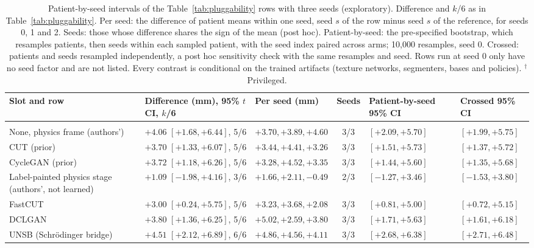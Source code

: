 
\begin{table}[tp]
\renewcommand{\baselinestretch}{1}\scriptsize\setlength{\fboxsep}{0.6pt}
\caption{Patient-by-seed intervals of the Table~\ref{tab:pluggability} rows with three seeds (exploratory). Difference and $k$/6 as in Table~\ref{tab:pluggability}. Per seed: the difference of patient means within one seed, seed $s$ of the row minus seed $s$ of the reference, for seeds 0, 1 and 2. Seeds: those whose difference shares the sign of the mean (post hoc). Patient-by-seed: the pre-specified bootstrap, which resamples patients, then seeds within each sampled patient, with the seed index paired across arms; 10,000 resamples, seed 0. Crossed: patients and seeds resampled independently, a post hoc sensitivity check with the same resamples and seed. Rows run at seed 0 only have no seed factor and are not listed. Every contrast is conditional on the trained artifacts (texture networks, segmenters, bases and policies). $^{\dagger}$Privileged.}
\label{tab:patient-seed}
\centering
\setlength{\tabcolsep}{3pt}
\begin{tabularx}{\textwidth}{@{}>{\raggedright\arraybackslash}X l l c l l@{}}
\toprule
Slot and row & Difference (mm), 95\% $t$ CI, $k$/6 & Per seed (mm) & Seeds & Patient-by-seed 95\% CI & Crossed 95\% CI \\
\midrule
\multicolumn{6}{@{}l}{\textit{Texture stage}, minus SonoSPADE} \\
\quad None, physics frame (authors') & $+4.06$ $[+1.68, +6.44]$, 5/6 & $+3.70, +3.89, +4.60$ & 3/3 & $[+2.09, +5.70]$ & $[+1.99, +5.75]$ \\
\quad CUT (prior)~\cite{cut} & $+3.70$ $[+1.33, +6.07]$, 5/6 & $+3.44, +4.41, +3.26$ & 3/3 & $[+1.51, +5.73]$ & $[+1.37, +5.72]$ \\
\quad CycleGAN (prior)~\cite{cyclegan} & $+3.72$ $[+1.18, +6.26]$, 5/6 & $+3.28, +4.52, +3.35$ & 3/3 & $[+1.44, +5.60]$ & $[+1.35, +5.68]$ \\
\quad Label-painted physics stage (authors', not learned) & $+1.09$ $[-1.98, +4.16]$, 3/6 & $+1.66, +2.11, -0.49$ & 2/3 & $[-1.27, +3.46]$ & $[-1.53, +3.80]$ \\
\quad FastCUT~\cite{cut} & $+3.00$ $[+0.24, +5.75]$, 5/6 & $+3.23, +3.68, +2.08$ & 3/3 & $[+0.81, +5.00]$ & $[+0.72, +5.15]$ \\
\quad DCLGAN~\cite{han2021dclgan} & $+3.80$ $[+1.36, +6.25]$, 5/6 & $+5.02, +2.59, +3.80$ & 3/3 & $[+1.71, +5.63]$ & $[+1.61, +6.18]$ \\
\quad UNSB (Schr\"{o}dinger bridge)~\cite{kim2024unsb} & $+4.51$ $[+2.12, +6.89]$, 6/6 & $+4.86, +4.56, +4.11$ & 3/3 & $[+2.68, +6.38]$ & $[+2.71, +6.48]$ \\

\end{tabularx}
\end{table}
